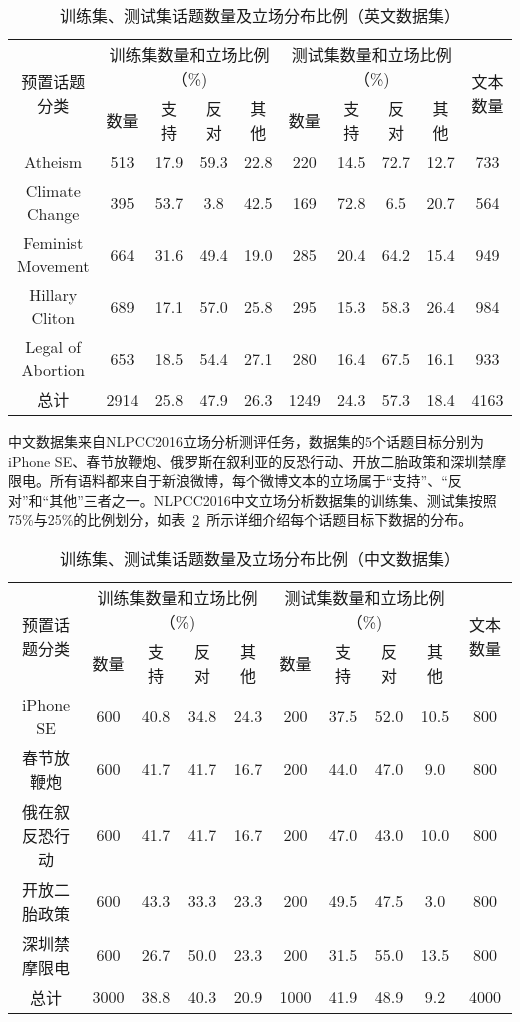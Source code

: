 \begin{table}[htbp]
	\caption[table123]{训练集、测试集话题数量及立场分布比例（英文数据集）}
	\label{englishdata}
	\vspace{0.5em}\centering\wuhao
	\begin{tabular}{cccccccccc}
		\toprule[1.5pt]
		\multirow{2}{*}{预置话题分类}& \multicolumn{4}{c}{训练集数量和立场比例（\%)} 
		& \multicolumn{4}{c}{测试集数量和立场比例（\%)}  &\multirow{2}{*}{文本数量}\\
		\cline{2-9}
		\quad&数量& 支持&反对&其他&数量& 支持&反对&其他 \\
		\midrule[1pt]
		Atheism&513&17.9&59.3&22.8&220&14.5&72.7&12.7&733\\
		Climate Change&395&53.7&3.8&42.5&169&72.8&6.5&20.7&564\\
		Feminist Movement&664&31.6&49.4&19.0&285&20.4&64.2&15.4&949\\
		Hillary Cliton&689&17.1&57.0&25.8&295&15.3&58.3&26.4&984\\
		Legal of Abortion&653&18.5&54.4&27.1&280&16.4&67.5&16.1&933\\
		总计&2914&25.8&47.9&26.3&1249&24.3&57.3&18.4&4163\\
		\bottomrule[1.5pt]
	\end{tabular}
\end{table}

中文数据集来自NLPCC2016立场分析测评任务，数据集的5个话题目标分别为 iPhone SE、春节放鞭炮、俄罗斯在叙利亚的反恐行动、开放二胎政策和深圳禁摩限电。所有语料都来自于新浪微博，每个微博文本的立场属于“支持”、“反对”和“其他”三者之一。NLPCC2016中文立场分析数据集的训练集、测试集按照75\%与25\%的比例划分，如表~\ref{chinesedata}~所示详细介绍每个话题目标下数据的分布。

\begin{table}[htbp]
	\caption[table123]{训练集、测试集话题数量及立场分布比例（中文数据集）}
	\label{chinesedata}
	\vspace{0.5em}\centering\wuhao
	\begin{tabular}{cccccccccc}
		\toprule[1.5pt]
		\multirow{2}{*}{预置话题分类}& \multicolumn{4}{c}{训练集数量和立场比例（\%)} 
		& \multicolumn{4}{c}{测试集数量和立场比例（\%)}  &\multirow{2}{*}{文本数量}\\
		\cline{2-9}
		\quad&数量& 支持&反对&其他&数量& 支持&反对&其他 \\
		\midrule[1pt]
		iPhone SE&600&40.8&34.8&24.3&200&37.5&52.0&10.5&800\\
		春节放鞭炮&600&41.7&41.7&16.7&200&44.0&47.0&9.0&800\\
		俄在叙反恐行动&600&41.7&41.7&16.7&200&47.0&43.0&10.0&800\\
		开放二胎政策&600&43.3&33.3&23.3&200&49.5&47.5&3.0&800\\
		深圳禁摩限电&600&26.7&50.0&23.3&200&31.5&55.0&13.5&800\\
		总计&3000&38.8&40.3&20.9&1000&41.9&48.9&9.2&4000\\
		\bottomrule[1.5pt]
	\end{tabular}
\end{table}

